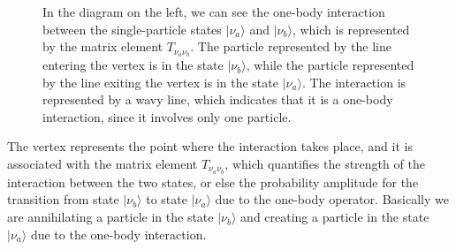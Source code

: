 \begin{figure}[H]
    \begin{minipage}{0.45\textwidth}
        \centering
    \end{minipage}
    \hfill
    \begin{minipage}{0.5\textwidth}
        In the diagram on the left, we can see the one-body interaction between the single-particle states \(|\nu_a\rangle\) and \(|\nu_b\rangle\), which is represented by the matrix element \(T_{\nu_a\nu_b}\). The particle represented by the line entering the vertex is in the state \(|\nu_b\rangle\), while the particle represented by the line exiting the vertex is in the state \(|\nu_a\rangle\). The interaction is represented by a wavy line, which indicates that it is a one-body interaction, since it involves only one particle.
    \end{minipage}
\end{figure}

The vertex represents the point where the interaction takes place, and it is associated with the matrix element \(T_{\nu_a\nu_b}\), which quantifies the strength of the interaction between the two states, or else the probability amplitude for the transition from state \(|\nu_b\rangle\) to state \(|\nu_a\rangle\) due to the one-body operator. Basically we are annihilating a particle in the state \(|\nu_b\rangle\) and creating a particle in the state \(|\nu_a\rangle\) due to the one-body interaction.

